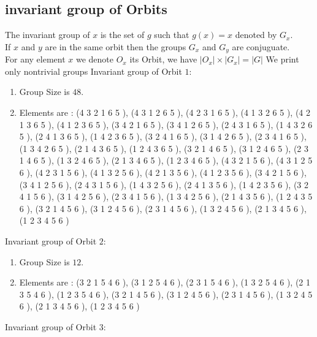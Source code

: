 \documentclass[12pt]{article}
\begin{document}
\subsection{invariant group of Orbits}
\noindent The invariant group of $x$ is the set of $g$ such that $g(x)=x$ denoted by $G_x$.\\
If $x$ and $y$ are in the same orbit then the groups $G_x$ and  $G_y$ are conjuguate.\\
For any element $x$ we denote $O_x$ its Orbit, we have $|O_x|\times |G_x|=|G|$
We print only nontrivial groups
Invariant group of Orbit $1$:
\begin{enumerate}
\item Group Size is $48$.
\item Elements are : (4 3 2 1 6 5  ), (4 3 1 2 6 5  ), (4 2 3 1 6 5  ), (4 1 3 2 6 5  ), (4 2 1 3 6 5  ), (4 1 2 3 6 5  ), (3 4 2 1 6 5  ), (3 4 1 2 6 5  ), (2 4 3 1 6 5  ), (1 4 3 2 6 5  ), (2 4 1 3 6 5  ), (1 4 2 3 6 5  ), (3 2 4 1 6 5  ), (3 1 4 2 6 5  ), (2 3 4 1 6 5  ), (1 3 4 2 6 5  ), (2 1 4 3 6 5  ), (1 2 4 3 6 5  ), (3 2 1 4 6 5  ), (3 1 2 4 6 5  ), (2 3 1 4 6 5  ), (1 3 2 4 6 5  ), (2 1 3 4 6 5  ), (1 2 3 4 6 5  ), (4 3 2 1 5 6  ), (4 3 1 2 5 6  ), (4 2 3 1 5 6  ), (4 1 3 2 5 6  ), (4 2 1 3 5 6  ), (4 1 2 3 5 6  ), (3 4 2 1 5 6  ), (3 4 1 2 5 6  ), (2 4 3 1 5 6  ), (1 4 3 2 5 6  ), (2 4 1 3 5 6  ), (1 4 2 3 5 6  ), (3 2 4 1 5 6  ), (3 1 4 2 5 6  ), (2 3 4 1 5 6  ), (1 3 4 2 5 6  ), (2 1 4 3 5 6  ), (1 2 4 3 5 6  ), (3 2 1 4 5 6  ), (3 1 2 4 5 6  ), (2 3 1 4 5 6  ), (1 3 2 4 5 6  ), (2 1 3 4 5 6  ), (1 2 3 4 5 6  )
\end{enumerate}
Invariant group of Orbit $2$:
\begin{enumerate}
\item Group Size is $12$.
\item Elements are : (3 2 1 5 4 6  ), (3 1 2 5 4 6  ), (2 3 1 5 4 6  ), (1 3 2 5 4 6  ), (2 1 3 5 4 6  ), (1 2 3 5 4 6  ), (3 2 1 4 5 6  ), (3 1 2 4 5 6  ), (2 3 1 4 5 6  ), (1 3 2 4 5 6  ), (2 1 3 4 5 6  ), (1 2 3 4 5 6  )
\end{enumerate}
Invariant group of Orbit $3$:
\end{document}
